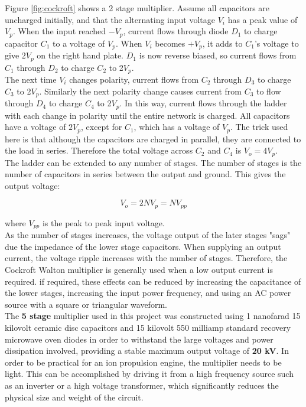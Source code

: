 \documentclass[11pt]{article}
\begin{document}
Figure \ref{fig:cockroft} shows a 2 stage multiplier. Assume all capacitors are uncharged initially, and that the alternating input voltage $V_i$ has a peak value of $V_p$. When the input reached $-V_p$, current flows through diode $D_1$ to charge capacitor $C_1$ to a voltage of $V_p$. When $V_i$ becomes $+V_p$, it adds to $C_1$'s voltage to give $2V_p$ on the right hand plate. $D_1$ is now reverse biased, so current flows from $C_1$ through $D_2$ to charge $C_2$ to 2$V_p$.\\

The next time $V_i$ changes polarity, current flows from $C_2$ through $D_3$ to charge $C_3$ to 2$V_p$. Similarly the next polarity change causes current from $C_3$ to flow through $D_4$ to charge $C_4$ to 2$V_p$. In this way, current flows through the ladder with each change in polarity until the entire network is charged. All capacitors have a voltage of $2V_p$, except for $C_1$, which has a voltage of $V_p$. The trick used here is that although the capacitors are charged in parallel, they are connected to the load in series. Therefore the total voltage across $C_2$ and $C_4$ is $V_o = 4V_p$.\\

The ladder can be extended to any number of stages. The number of stages is the number of capacitors in series between the output and ground. This gives the output voltage:

\begin{equation}
V_o=2NV_p=NV_{pp}
\end{equation}

where $V_{pp}$ is the peak to peak input voltage.\\

As the number of stages increases, the voltage output of the later stages "sags" due the impedance of the lower stage capacitors. When supplying an output current, the voltage ripple increases with the number of stages. Therefore, the Cockroft Walton multiplier is generally used when a low output current is required. if required, these effects can be reduced by increasing the capacitance of the lower stages, increasing the input power frequency, and using an AC power source with a square or triangular waveform.\\

The \textbf{5 stage} multiplier used in this project was constructed using 1 nanofarad 15 kilovolt ceramic disc capacitors and 15 kilovolt 550 milliamp standard recovery microwave oven diodes in order to withstand the large voltages and power dissipation involved, providing a stable maximum output voltage of \textbf{20 kV}. In order to be practical for an ion propulsion engine, the multiplier needs to be light. This can be accomplished by driving it from a high frequency source such as an inverter or a high voltage transformer, which significantly reduces the physical size and weight of the circuit.
\end{document}
